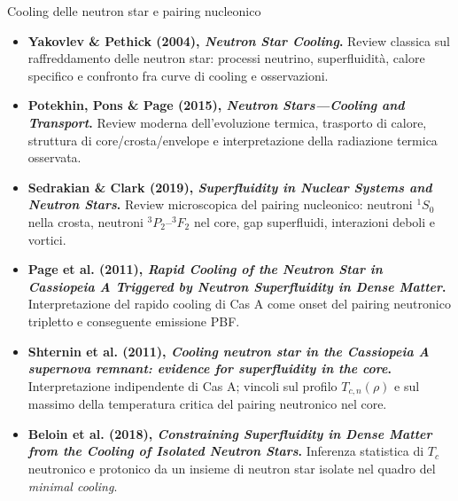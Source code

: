 \begin{frame}{Cooling delle neutron star e pairing nucleonico}
\small
\begin{itemize}
  \item \textbf{Yakovlev \& Pethick (2004), \emph{Neutron Star Cooling}.}
  Review classica sul raffreddamento delle neutron star:
  processi neutrino, superfluidità, calore specifico e confronto
  fra curve di cooling e osservazioni.
  \item \textbf{Potekhin, Pons \& Page (2015),
  \emph{Neutron Stars---Cooling and Transport}.}
  Review moderna dell'evoluzione termica, trasporto di calore,
  struttura di core/crosta/envelope e interpretazione
  della radiazione termica osservata.
  \item \textbf{Sedrakian \& Clark (2019),
  \emph{Superfluidity in Nuclear Systems and Neutron Stars}.}
  Review microscopica del pairing nucleonico:
  neutroni $^1S_0$ nella crosta, neutroni $^3P_2$--$^3F_2$
  nel core, gap superfluidi, interazioni deboli e vortici.
  \item \textbf{Page et al. (2011),
  \emph{Rapid Cooling of the Neutron Star in Cassiopeia A
  Triggered by Neutron Superfluidity in Dense Matter}.}
  Interpretazione del rapido cooling di Cas A come onset
  del pairing neutronico tripletto e conseguente emissione PBF.
  \item \textbf{Shternin et al. (2011),
  \emph{Cooling neutron star in the Cassiopeia A supernova remnant:
  evidence for superfluidity in the core}.}
  Interpretazione indipendente di Cas A; vincoli sul profilo
  $T_{c,n}(\rho)$ e sul massimo della temperatura critica
  del pairing neutronico nel core.
  \item \textbf{Beloin et al. (2018),
  \emph{Constraining Superfluidity in Dense Matter from the Cooling
  of Isolated Neutron Stars}.}
  Inferenza statistica di $T_c$ neutronico e protonico
  da un insieme di neutron star isolate nel quadro del
  \emph{minimal cooling}.
\end{itemize}
\end{frame}

